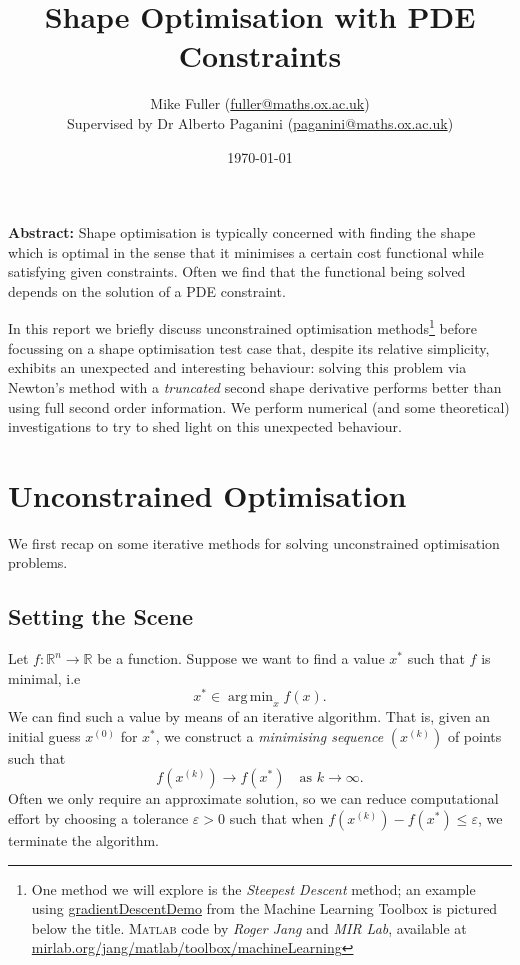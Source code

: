\documentclass[a4paper,11pt]{article}
\title{\vspace{-2.3em}\textbf{Shape Optimisation with PDE Constraints}\vspace{-0.4cm}}
\author{Mike Fuller (\url{fuller@maths.ox.ac.uk})\\ Supervised by Dr Alberto Paganini (\url{paganini@maths.ox.ac.uk})}
\date{\today}
\DeclareMathOperator*{\argmin}{arg\,min}
\begin{document}
\maketitle

\vspace{15mm}



\vspace{22mm}

\textbf{Abstract:} Shape optimisation is typically concerned with finding the shape which is optimal in the sense that it minimises a certain cost functional while satisfying given constraints. Often we find that the functional being solved depends on the solution of a PDE constraint.

\vspace{3mm}

In this report we briefly discuss unconstrained optimisation methods\footnote{One method we will explore is the \textit{Steepest Descent} method; an example using \url{gradientDescentDemo} from the Machine Learning Toolbox is pictured below the title. \textsc{Matlab} code by \textit{Roger Jang} and \textit{MIR Lab}, available at \url{mirlab.org/jang/matlab/toolbox/machineLearning}} before focussing on a shape optimisation test case that, despite its relative simplicity, exhibits an unexpected and interesting behaviour: solving this problem via Newton's method with a \textit{truncated} second shape derivative performs better than using full second order information. We perform numerical (and some theoretical) investigations to try to shed light on this unexpected behaviour.

\newpage

\tableofcontents

\newpage

\section{Unconstrained Optimisation}

We first recap on some iterative methods for solving unconstrained optimisation problems.

\subsection{Setting the Scene}

Let $f:\mathbb{R}^n\rightarrow\mathbb{R}$ be a function. Suppose we want to find a value $x^*$ such that $f$ is minimal, i.e $$x^*\in\argmin_{x} f(x).$$ We can find such a value by means of an iterative algorithm. That is, given an initial guess $x^{(0)}$ for $x^*$, we construct a \textit{minimising sequence} $(x^{(k)})$ of points such that $$f(x^{(k)})\longrightarrow f(x^*) \quad \text{as }k\rightarrow\infty.$$ Often we only require an approximate solution, so we can reduce computational effort by choosing a tolerance $\varepsilon>0$ such that when $f(x^{(k)})-f(x^*)\leqslant \varepsilon$, we terminate the algorithm.
\end{document}
